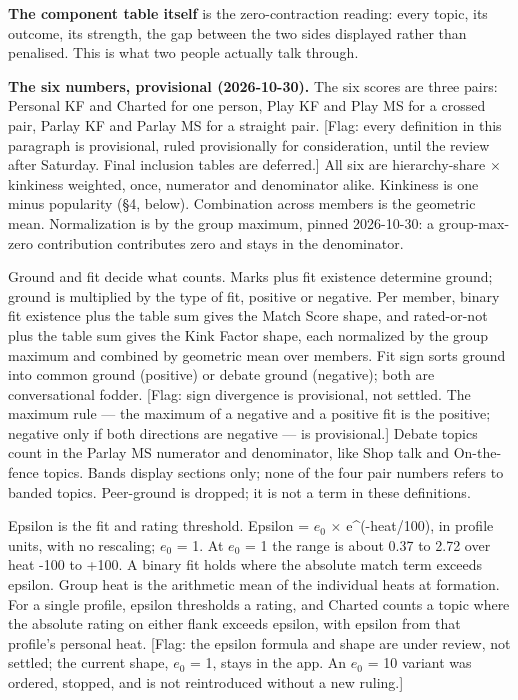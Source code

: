 \textbf{The component table itself} is the zero-contraction reading:
every topic, its outcome, its strength, the gap between the two sides
displayed rather than penalised. This is what two people actually talk
through.

\textbf{The six numbers, provisional (2026-10-30).} The six scores are
three pairs: Personal KF and Charted for one person, Play KF and Play MS
for a crossed pair, Parlay KF and Parlay MS for a straight pair.
{[}Flag: every definition in this paragraph is provisional, ruled
provisionally for consideration, until the review after Saturday. Final
inclusion tables are deferred.{]} All six are hierarchy-share $\times$
kinkiness weighted, once, numerator and denominator alike. Kinkiness is
one minus popularity (\S 4, below). Combination across members is the
geometric mean. Normalization is by the group maximum, pinned
2026-10-30: a group-max-zero contribution contributes zero and stays in
the denominator.

Ground and fit decide what counts. Marks plus fit existence determine
ground; ground is multiplied by the type of fit, positive or negative.
Per member, binary fit existence plus the table sum gives the Match
Score shape, and rated-or-not plus the table sum gives the Kink Factor
shape, each normalized by the group maximum and combined by geometric
mean over members. Fit sign sorts ground into common ground (positive)
or debate ground (negative); both are conversational fodder. {[}Flag:
sign divergence is provisional, not settled. The maximum rule --- the
maximum of a negative and a positive fit is the positive; negative only
if both directions are negative --- is provisional.{]} Debate topics
count in the Parlay MS numerator and denominator, like Shop talk and
On-the-fence topics. Bands display sections only; none of the four pair
numbers refers to banded topics. Peer-ground is dropped; it is not a
term in these definitions.

Epsilon is the fit and rating threshold. Epsilon = $e_0$ $\times$
e\^{}(-heat/100), in profile units, with no rescaling; $e_0$ = 1. At $e_0$ = 1
the range is about 0.37 to 2.72 over heat -100 to +100. A binary fit
holds where the absolute match term exceeds epsilon. Group heat is the
arithmetic mean of the individual heats at formation. For a single
profile, epsilon thresholds a rating, and Charted counts a topic where
the absolute rating on either flank exceeds epsilon, with epsilon from
that profile's personal heat. {[}Flag: the epsilon formula and shape are
under review, not settled; the current shape, $e_0$ = 1, stays in the app.
An $e_0$ = 10 variant was ordered, stopped, and is not reintroduced without
a new ruling.{]}

